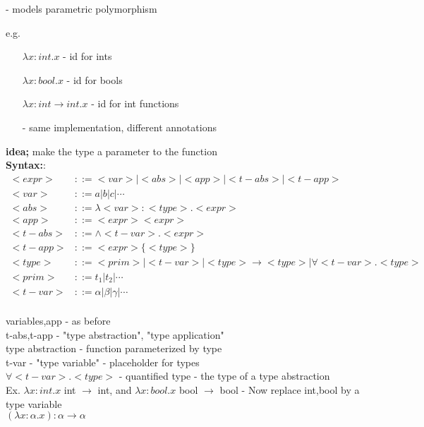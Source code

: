 \documentclass[11pt]{article}
\begin{document}
- models parametric polymorphism

e.g.
\begin{itemize}
	\item[] $\lambda x:int.x$ - id for ints
	\item[] $\lambda x:bool.x$ - id for bools
	\item[] $\lambda x:int\rightarrow int.x$ - id for int functions
	\item[-] same implementation, different annotations
\end{itemize}

{\bf idea;} make the type a parameter to the function \\

{\bf Syntax:}:
\begin{align*}
	<expr> &::= <var>|<abs>|<app>|<t-abs>|<t-app> \\
	<var> &::= a|b|c|\cdots \\
	<abs> &::= \lambda <var>:<type>.<expr> \\
	<app> &::= <expr><expr> \\
	<t-abs> &::= \land <t-var>.<expr> \\
	<t-app> &::= <expr>\{<type>\} \\
	<type> &::= <prim>|<t-var>|<type>\rightarrow <type>|\forall <t-var>.<type>\\
	<prim> &::= t_1|t_2|\cdots \\
	<t-var> &::= \alpha|\beta|\gamma|\cdots \\
\end{align*}

variables,app - as before \\

t-abs,t-app - "type abstraction", "type application" \\

type abstraction - function parameterized by type \\

t-var - "type variable" - placeholder for types \\

$\forall <t-var>.<type>$ - quantified type - the type of a type abstraction \\

Ex. $\lambda x:int.x$  int $\rightarrow$ int, and $\lambda x:bool.x$   bool $\rightarrow$ bool  - Now replace int,bool by a type variable \\

$(\lambda x:\alpha.x): \alpha \rightarrow \alpha$ \\
\end{document}
